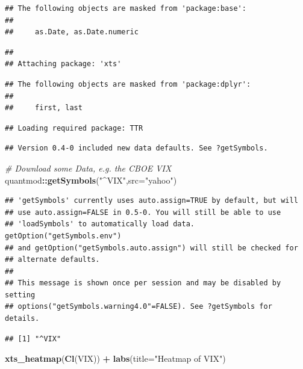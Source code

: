 \documentclass[]{krantz}
\makeatletter
\newenvironment{Shaded}{\begin{snugshade}}{\end{snugshade}}
\newcommand{\CommentTok}[1]{\textcolor[rgb]{0.56,0.35,0.01}{\textit{#1}}}
\newcommand{\DataTypeTok}[1]{\textcolor[rgb]{0.13,0.29,0.53}{#1}}
\newcommand{\KeywordTok}[1]{\textcolor[rgb]{0.13,0.29,0.53}{\textbf{#1}}}
\newcommand{\NormalTok}[1]{#1}
\newcommand{\OperatorTok}[1]{\textcolor[rgb]{0.81,0.36,0.00}{\textbf{#1}}}
\newcommand{\StringTok}[1]{\textcolor[rgb]{0.31,0.60,0.02}{#1}}
\newenvironment{kframe}{%
\medskip{}
\setlength{\fboxsep}{.8em}
 \def\at@end@of@kframe{}%
 \ifinner\ifhmode%
  \def\at@end@of@kframe{\end{minipage}}%
  \begin{minipage}{\columnwidth}%
 \fi\fi%
 \def\FrameCommand##1{\hskip\@totalleftmargin \hskip-\fboxsep
 \colorbox{shadecolor}{##1}\hskip-\fboxsep
     \hskip-\linewidth \hskip-\@totalleftmargin \hskip\columnwidth}%
 \MakeFramed {\advance\hsize-\width
   \@totalleftmargin\z@ \linewidth\hsize
   \@setminipage}}%
 {\par\unskip\endMakeFramed%
 \at@end@of@kframe}
\renewenvironment{Shaded}{\begin{kframe}}{\end{kframe}}
\makeatother
\begin{document}
\begin{verbatim}
## The following objects are masked from 'package:base':
## 
##     as.Date, as.Date.numeric
\end{verbatim}

\begin{verbatim}
## 
## Attaching package: 'xts'
\end{verbatim}

\begin{verbatim}
## The following objects are masked from 'package:dplyr':
## 
##     first, last
\end{verbatim}

\begin{verbatim}
## Loading required package: TTR
\end{verbatim}

\begin{verbatim}
## Version 0.4-0 included new data defaults. See ?getSymbols.
\end{verbatim}

\begin{Shaded}
\begin{Highlighting}[]
\CommentTok{# Download some Data, e.g. the CBOE VIX }
\NormalTok{quantmod}\OperatorTok{::}\KeywordTok{getSymbols}\NormalTok{(}\StringTok{"^VIX"}\NormalTok{,}\DataTypeTok{src=}\StringTok{"yahoo"}\NormalTok{)}
\end{Highlighting}
\end{Shaded}

\begin{verbatim}
## 'getSymbols' currently uses auto.assign=TRUE by default, but will
## use auto.assign=FALSE in 0.5-0. You will still be able to use
## 'loadSymbols' to automatically load data. getOption("getSymbols.env")
## and getOption("getSymbols.auto.assign") will still be checked for
## alternate defaults.
## 
## This message is shown once per session and may be disabled by setting 
## options("getSymbols.warning4.0"=FALSE). See ?getSymbols for details.
\end{verbatim}

\begin{verbatim}
## [1] "^VIX"
\end{verbatim}

\begin{Shaded}
\begin{Highlighting}[]
\KeywordTok{xts_heatmap}\NormalTok{(}\KeywordTok{Cl}\NormalTok{(VIX)) }\OperatorTok{+}\StringTok{ }\KeywordTok{labs}\NormalTok{(}\DataTypeTok{title=}\StringTok{"Heatmap of VIX"}\NormalTok{)}
\end{Highlighting}
\end{Shaded}
\end{document}
